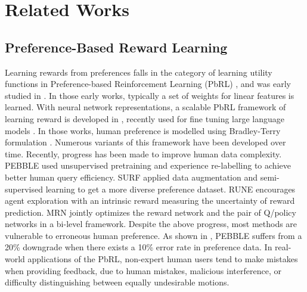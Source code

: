 \section{Related Works}
\subsection{Preference-Based Reward Learning}
\vspace{-5pt}
Learning rewards from preferences falls in the category of learning utility functions in Preference-based Reinforcement Learning (PbRL) \cite{wirth2017survey}, and was early studied in  \cite{zucker2010optimization,akrour2012april,akrour2014programming}. In those early works, typically a set of weights for linear features is learned. With neural network representations, a scalable PbRL framework of learning reward is developed in \cite{christiano2017deep}, recently used for fine tuning large language models \cite{bakker2022fine,achiam2023gpt}.  In those works, human preference is modelled using  Bradley-Terry formulation \cite{bradley1952rank}.
Numerous variants of this framework have been developed \cite{hejna2023few,hejna2023contrastive,pmlr-v164-myers22a,10160439} over time. Recently, progress has been made to improve human data complexity. PEBBLE \cite{pmlr-v139-lee21i} used unsupervised pretraining and experience re-labelling to achieve better human query efficiency. SURF \cite{park2022surf} applied data augmentation and semi-supervised learning to get a more diverse preference dataset. RUNE \cite{liang2022reward} encourages agent exploration with an intrinsic reward measuring the uncertainty of reward prediction. MRN \cite{liu2022meta} jointly optimizes the reward network and the pair of Q/policy networks in a bi-level framework. Despite the above progress, most methods are vulnerable to erroneous human preference. As shown in \cite{lee2021b}, PEBBLE suffers from a 20\% downgrade when there exists a 10\% error rate in preference data. In real-world applications of the PbRL, non-expert human users tend to make mistakes when providing feedback, due to human mistakes,  malicious interference, or difficulty distinguishing between equally undesirable motions. 








